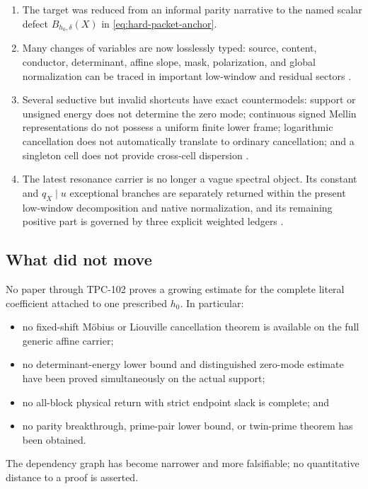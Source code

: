\begin{enumerate}[leftmargin=2em]
\item The target was reduced from an informal parity narrative to the
  named scalar defect \(B_{h_0,\delta}(X)\) in
  \eqref{eq:hard-packet-anchor}.
\item Many changes of variables are now losslessly typed: source,
  content, conductor, determinant, affine slope, mask, polarization,
  and global normalization can be traced in important low-window and
  residual sectors \cite{WangTPC18,WangTPC70,WangTPC93}.
\item Several seductive but invalid shortcuts have exact
  countermodels: support or unsigned energy does not determine the
  zero mode; continuous signed Mellin representations do not possess
  a uniform finite lower frame; logarithmic cancellation does not
  automatically translate to ordinary cancellation; and a
  singleton cell does not provide cross-cell dispersion
  \cite{WangTPC51,WangTPC81,WangTPC90,WangTPC100}.
\item The latest resonance carrier is no longer a vague spectral
  object.  Its constant and \(q_X\mid u\) exceptional branches are
  separately returned within the present low-window decomposition and
  native normalization, and its remaining positive part is governed
  by three explicit weighted ledgers
  \cite{WangTPC98,WangTPC101,WangTPC102}.
\end{enumerate}

\subsection{What did not move}

No paper through TPC-102 proves a growing estimate for the complete
literal coefficient attached to one prescribed \(h_0\).  In
particular:
\begin{itemize}[leftmargin=2em]
\item no fixed-shift M\"obius or Liouville cancellation theorem is
  available on the full generic affine carrier;
\item no determinant-energy lower bound and distinguished zero-mode
  estimate have been proved simultaneously on the actual support;
\item no all-block physical return with strict endpoint slack is
  complete; and
\item no parity breakthrough, prime-pair lower bound, or twin-prime
  theorem has been obtained.
\end{itemize}
The dependency graph has become narrower and more falsifiable; no
quantitative distance to a proof is asserted.
